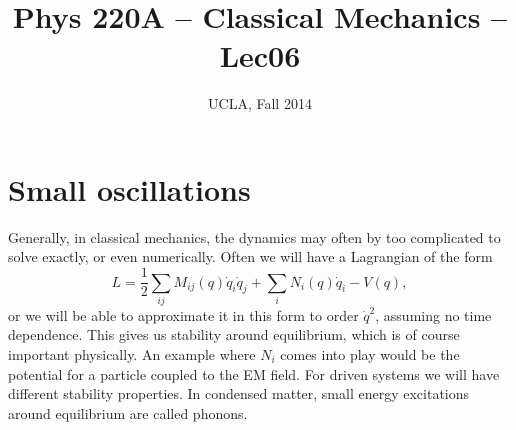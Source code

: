 
\usepackage[margin=1in]{geometry} %





\title{Phys 220A -- Classical Mechanics -- Lec06}
\author{UCLA, Fall 2014}
\date{} %


\setlength{\unitlength}{1mm}
\maketitle


\section{Small oscillations}

Generally, in classical mechanics, the dynamics may often by too complicated to solve exactly, or even numerically. Often we will have a Lagrangian of the form
\begin{equation}
L = \frac{1}{2} \sum_{ij} M_{ij}(q) \dot{q}_i \dot{q}_j + \sum_i N_i (q) \dot{q}_i - V(q),
\end{equation}
or we will be able to approximate it in this form to order $\dot{q}^2$, assuming no time dependence. This gives us stability around equilibrium, which is of course important physically. An example where $N_i$ comes into play would be the potential for a particle coupled to the EM field. For driven systems we will have different stability properties. In condensed matter, small energy excitations around equilibrium are called phonons. 

